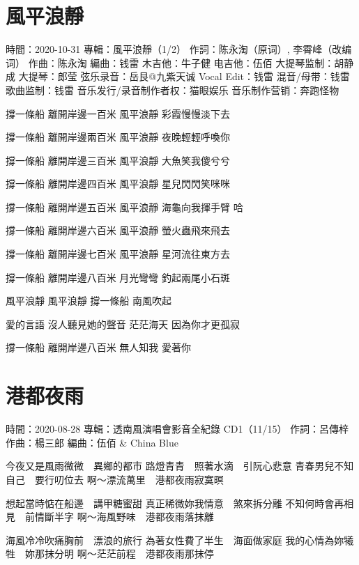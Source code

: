 \documentclass[UTF8,a4paper,oneside,twocolumn,12pt]{ctexbook}
\newcommand{\infopair}[2]{\textbullet #1：#2}
\newcommand{\zc}[1][伍佰]{\infopair{作詞}{#1}}
\newcommand{\zq}[1][伍佰]{\infopair{作曲}{#1}}
\newcommand{\bq}[1][伍佰]{\infopair{編曲}{#1}}
\newcommand{\zj}[1]{\infopair{專輯}{#1}}
\newcommand{\sj}[1]{\infopair{時間}{#1}}
\newenvironment{info}{\begin{flushleft}\kaishu
	}
	{\end{flushleft}\normalsize\yahei\par}
\newenvironment{lyric}{
	}
{}
\begin{document}
\section{風平浪靜}
\begin{info}
	\sj{2020-10-31}
	\zj{風平浪靜（1/2）}
	\zc[陈永淘（原词）, 李霄峰（改编词）]
	\zq[陈永淘]
	\bq[钱雷]
	\infopair{木吉他}{牛子健}
	\infopair{电吉他}{伍佰}
	\infopair{大提琴监制}{胡静成}
	\infopair{大提琴}{郎莹}
	\infopair{弦乐录音}{岳艮@九紫天诚}
	\infopair{Vocal Edit}{钱雷}
	\infopair{混音/母带}{钱雷}
	\infopair{歌曲监制}{钱雷}
	\infopair{音乐发行/录音制作者权}{猫眼娱乐}
	\infopair{音乐制作营销}{奔跑怪物}
\end{info}
\begin{lyric}
	撐一條船 離開岸邊一百米
	風平浪靜 彩霞慢慢淡下去

	撐一條船 離開岸邊兩百米
	風平浪靜 夜晚輕輕呼喚你

	撐一條船 離開岸邊三百米
	風平浪靜 大魚笑我傻兮兮

	撐一條船 離開岸邊四百米
	風平浪靜 星兒閃閃笑咪咪

	撐一條船 離開岸邊五百米
	風平浪靜 海龜向我揮手臂 哈

	撐一條船 離開岸邊六百米
	風平浪靜 螢火蟲飛來飛去

	撐一條船 離開岸邊七百米
	風平浪靜 星河流往東方去

	撐一條船 離開岸邊八百米
	月光彎彎 釣起兩尾小石斑

	風平浪靜 風平浪靜
	撐一條船 南風吹起

	愛的言語 沒人聽見她的聲音
	茫茫海天 因為你才更孤寂

	撐一條船 離開岸邊八百米
	無人知我 愛著你
\end{lyric}

\section{港都夜雨}
\begin{info}
	\sj{2020-08-28}
	\zj{透南風演唱會影音全紀錄 CD1（11/15）}
	\zc[呂傳梓]
	\zq[楊三郎]
	\bq[伍佰 \& China Blue]
\end{info}
\begin{lyric}
	今夜又是風雨微微　異鄉的都市
	路燈青青　照著水滴　引阮心悲意
	青春男兒不知自己　要行叨位去
	啊～漂流萬里　港都夜雨寂寞暝

	想起當時惦在船邊　講甲糖蜜甜
	真正稀微妳我情意　煞來拆分離
	不知何時會再相見　前情斷半字
	啊～海風野味　港都夜雨落抹離

	海風冷冷吹痛胸前　漂浪的旅行
	為著女性費了半生　海面做家庭
	我的心情為妳犧牲　妳那抹分明
	啊～茫茫前程　港都夜雨那抹停
\end{lyric}
\end{document}
